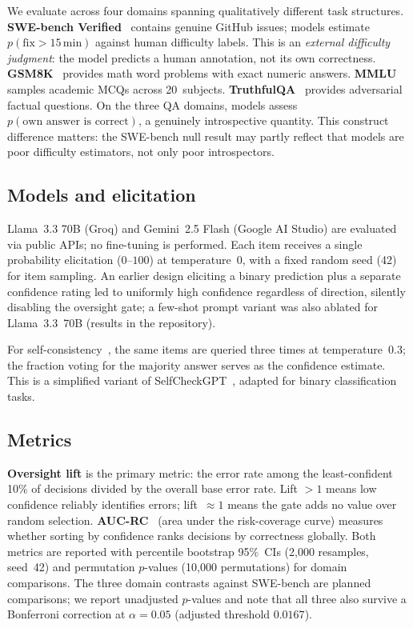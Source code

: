 \documentclass[10pt,twocolumn]{article}
\begin{document}
We evaluate across four domains spanning qualitatively different task structures.
\textbf{SWE-bench Verified}~\citep{jimenez2024} contains genuine GitHub issues;
models estimate $p(\text{fix}{>}15\,\text{min})$ against human difficulty
labels. This is an \emph{external difficulty judgment}: the model predicts a
human annotation, not its own correctness.
\textbf{GSM8K}~\citep{cobbe2021} provides math word problems with exact numeric
answers.
\textbf{MMLU}~\citep{hendrycks2021} samples academic MCQs across 20~subjects.
\textbf{TruthfulQA}~\citep{lin2022} provides adversarial factual questions.
On the three QA domains, models assess $p(\text{own answer is correct})$, a
genuinely introspective quantity. This construct difference matters: the SWE-bench
null result may partly reflect that models are poor difficulty estimators, not
only poor introspectors.

\subsection{Models and elicitation}

Llama~3.3 70B (Groq) and Gemini~2.5 Flash (Google AI Studio) are evaluated via
public APIs; no fine-tuning is performed. Each item receives a single probability
elicitation ($0$--$100$) at temperature~$0$, with a fixed random seed (42) for
item sampling. An earlier design eliciting a binary prediction plus a
separate confidence rating led to uniformly high confidence regardless of
direction, silently disabling the oversight gate; a few-shot prompt variant was
also ablated for Llama~3.3~70B (results in the repository).

For self-consistency~\citep{wang2023sc}, the same items are queried three times
at temperature~$0.3$; the fraction voting for the majority answer serves as the
confidence estimate. This is a simplified variant of
SelfCheckGPT~\citep{manakul2023}, adapted for binary classification tasks.

\subsection{Metrics}

\textbf{Oversight lift} is the primary metric: the error rate among the
least-confident 10\% of decisions divided by the overall base error rate. Lift
$>1$ means low confidence reliably identifies errors; lift~$\approx1$ means the
gate adds no value over random selection. \textbf{AUC-RC}~\citep{geifman2017}
(area under the risk-coverage curve) measures whether sorting by confidence
ranks decisions by correctness globally. Both metrics are reported with
percentile bootstrap 95\%~CIs (2{,}000 resamples, seed~42) and permutation
$p$-values (10{,}000 permutations) for domain comparisons. The three domain
contrasts against SWE-bench are planned comparisons; we report unadjusted
$p$-values and note that all three also survive a Bonferroni correction at
$\alpha{=}0.05$ (adjusted threshold $0.0167$).
\end{document}
